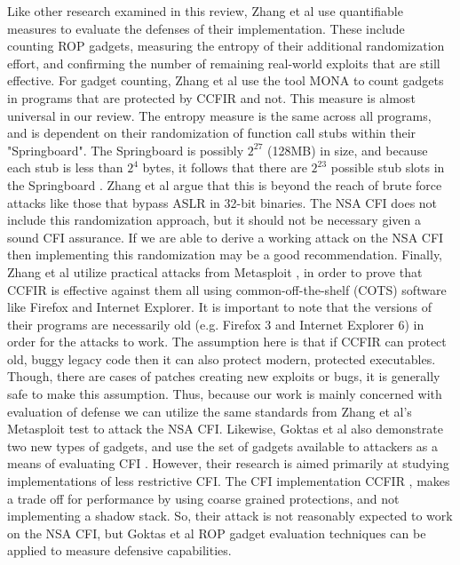 \documentclass[letterpaper,10pt]{article}
\begin{document}
\indent Like other research examined in this review, Zhang et al use quantifiable measures to evaluate the defenses of their implementation. These include counting ROP gadgets, measuring the entropy of their additional randomization effort, and confirming the number of remaining real-world exploits that are still effective. For gadget counting, Zhang et al use the tool MONA\cite{Mona} to count gadgets in programs that are protected by CCFIR and not. This measure is almost universal in our review. The entropy measure is the same across all programs, and is dependent on their randomization of function call stubs within their "Springboard"\cite{Zhang:2013:CCFIR}. The Springboard is possibly \(2^{27}\) (128MB) in size, and because each stub is less than \(2^4\) bytes, it follows that there are \(2^{23}\) possible stub slots in the Springboard \cite{Zhang:2013:CCFIR}. Zhang et al argue that this is beyond the reach of brute force attacks like those that bypass ASLR in 32-bit binaries. The NSA CFI does not include this randomization approach, but it should not be necessary given a sound CFI assurance. If we are able to derive a working attack on the NSA CFI then implementing this randomization may be a good recommendation. Finally, Zhang et al utilize practical attacks from Metasploit \cite{Metasploit}, in order to prove that CCFIR is effective against them all using common-off-the-shelf (COTS) software like Firefox and Internet Explorer. It is important to note that the versions of their programs are necessarily old (e.g. Firefox 3 and Internet Explorer 6) in order for the attacks to work. The assumption here is that if CCFIR can protect old, buggy legacy code then it can also protect modern, protected executables. Though, there are cases of patches creating new exploits or bugs, it is generally safe to make this assumption. Thus, because our work is mainly concerned with evaluation of defense we can utilize the same standards from Zhang et al's Metasploit test to attack the NSA CFI.
\newline
\indent Likewise, Goktas et al also demonstrate two new types of gadgets, and use the set of gadgets available to attackers as a means of evaluating CFI \cite{goktas}. However, their research is aimed primarily at studying implementations of less restrictive CFI. The CFI implementation CCFIR \cite{Zhang:2013:CCFIR}, makes a trade off for performance by using coarse grained protections, and not implementing a shadow stack. So, their attack is not reasonably expected to work on the NSA CFI, but Goktas et al ROP gadget evaluation techniques can be applied to measure defensive capabilities.
\end{document}
